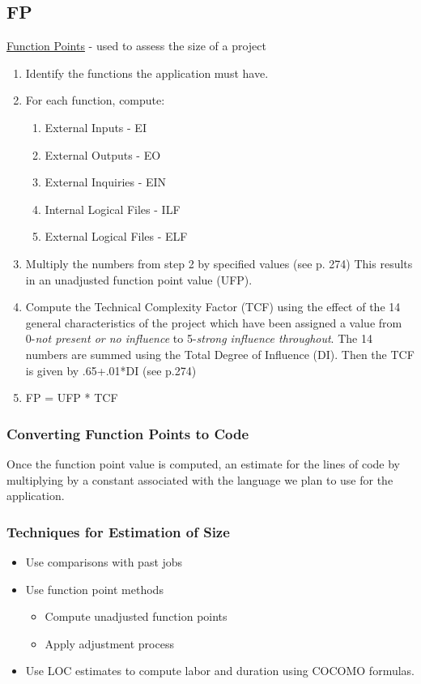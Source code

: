 \documentclass{report}
\begin{document}
			\subsection{FP}
				\underline{Function Points} - used to assess the size of a project
				\begin{enumerate}
					\item Identify the functions the application must have.
					\item For each function, compute:
						\begin{enumerate}
							\item External Inputs - EI
							\item External Outputs - EO
							\item External Inquiries - EIN
							\item Internal Logical Files - ILF
							\item External Logical Files - ELF
						\end{enumerate}
					\item Multiply the numbers from step 2 by specified values (see p. 274) This results in an unadjusted function point value (UFP).
					\item Compute the Technical Complexity Factor (TCF) using the effect of the 14 general characteristics of the project which have been assigned a value from 0-\textit{not present or no influence} to 5-\textit{strong influence throughout}. The 14 numbers are summed using the Total Degree of Influence (DI). Then the TCF is given by .65+.01*DI (see p.274)
					\item FP = UFP * TCF
				\end{enumerate}
				\subsubsection{Converting Function Points to Code}
					Once the function point value is computed, an estimate for the lines of code by multiplying by a constant associated with the language we plan to use for the application.
				\subsubsection{Techniques for Estimation of Size}
					\begin{itemize}
						\item Use comparisons with past jobs
						\item Use function point methods
							\begin{itemize}
								\item Compute unadjusted function points
								\item Apply adjustment process
							\end{itemize}
						\item Use LOC estimates to compute labor and duration using COCOMO formulas.
						\end{itemize}
\end{document}
